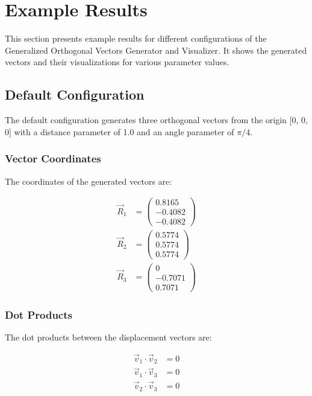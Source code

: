 \section{Example Results}

This section presents example results for different configurations of the Generalized Orthogonal Vectors Generator and Visualizer. It shows the generated vectors and their visualizations for various parameter values.

\subsection{Default Configuration}

The default configuration generates three orthogonal vectors from the origin [0, 0, 0] with a distance parameter of 1.0 and an angle parameter of $\pi/4$.

\subsubsection{Vector Coordinates}

The coordinates of the generated vectors are:

\begin{align}
\vec{R}_1 &= \begin{pmatrix} 0.8165 \\ -0.4082 \\ -0.4082 \end{pmatrix} \\
\vec{R}_2 &= \begin{pmatrix} 0.5774 \\ 0.5774 \\ 0.5774 \end{pmatrix} \\
\vec{R}_3 &= \begin{pmatrix} 0 \\ -0.7071 \\ 0.7071 \end{pmatrix}
\end{align}

\subsubsection{Dot Products}

The dot products between the displacement vectors are:

\begin{align}
\vec{v}_1 \cdot \vec{v}_2 &= 0 \\
\vec{v}_1 \cdot \vec{v}_3 &= 0 \\
\vec{v}_2 \cdot \vec{v}_3 &= 0
\end{align}

